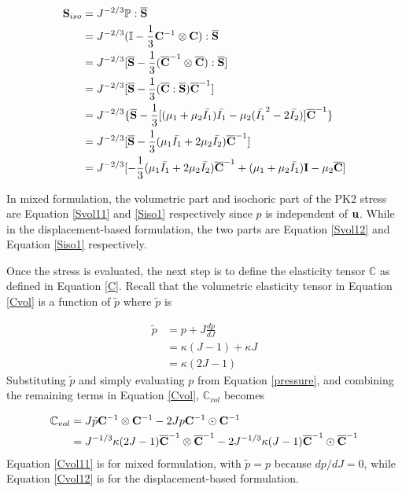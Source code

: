 \begin{equation} \label{Siso1}
\begin{split}
\bold{S}_{iso}
&= J^{-2/3}\mathbb{P}:\overline{\bold{S}} \\
&= J^{-2/3}( \mathbb{I} - \frac{1}{3}\bold{C}^{-1} \otimes \bold{C} ) : \overline{\bold{S}} \\
&= J^{-2/3} [\overline{\bold{S}} - \frac{1}{3}( \overline{\bold{C}}^{-1} \otimes \overline{\bold{C}} ) : \overline{\bold{S}} ]  \\
&= J^{-2/3}[ \overline{\bold{S}} - \frac{1}{3}(\overline{\bold{C}} : \overline{\bold{S}})\overline{\bold{C}}^{-1} ]  \\
&= J^{-2/3}\{ \overline{\bold{S}} - \frac{1}{3} [(\mu_1+\mu_2\bar{I_1})\bar{I_1} - \mu_2(\bar{I_1}^2-2\bar{I_2})]\overline{\bold{C}}^{-1} \} \\
&= J^{-2/3}[\overline{\bold{S}} -  \frac{1}{3}(\mu_1\bar{I_1} + 2\mu_2\bar{I_2}) \overline{\bold{C}}^{-1}] \\
&= J^{-2/3} [    - \frac{1}{3}(\mu_1\bar{I_1} + 2\mu_2\bar{I_2}) \overline{\bold{C}}^{-1}  + (\mu_1 + \mu_2\bar{I_1})\bold{I} - \mu_2\overline{\bold{C}} ]
\end{split}
\end{equation}

In mixed formulation, the volumetric part and isochoric part of the PK2 stress are Equation \ref{Svol11} and \ref{Siso1} respectively since $p$ is independent of $\bold{u}$. While in the displacement-based formulation, the two parts are Equation \ref{Svol12} and Equation \ref{Siso1} respectively.

Once the stress is evaluated, the next step is to define the elasticity tensor $\mathbb{C}$ as defined in Equation \ref{C}. Recall that the volumetric elasticity tensor in Equation \ref{Cvol} is a function of $\tilde{p}$ where $\tilde{p}$ is

\begin{equation}
\begin{split}
\tilde{p} &= p + J\frac{dp}{dJ} \\
             &= \kappa(J-1) + \kappa{J} \\
             &= \kappa{(2J - 1)}
\end{split}
\end{equation}
Substituting $\tilde{p}$ and simply evaluating $p$ from Equation \ref{pressure}, and combining the remaining terms in Equation \ref{Cvol}, $\mathbb{C}_{vol}$ becomes

\begin{subequations} \label{Cvol1}
\begin{align}
\mathbb{C}_{vol} &= J\tilde{p}\bold{C}^{-1}\otimes\bold{C}^{-1} - 2Jp\bold{C}^{-1}\odot\bold{C}^{-1} \label{Cvol11} \\
&=  J^{-1/3}\kappa{(2J-1)} \overline{\bold{C}}^{-1} \otimes \overline{\bold{C}}^{-1} - 2J^{-1/3}\kappa{(J-1)} \overline{\bold{C}}^{-1} \odot \overline{\bold{C}}^{-1} \label{Cvol12}
\end{align}
\end{subequations} 
Equation \ref{Cvol11} is for mixed formulation, with $\tilde{p} = p$ because $dp/dJ = 0$, while Equation \ref{Cvol12} is for the displacement-based formulation.

